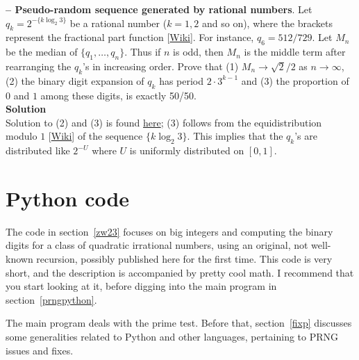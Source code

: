 \documentclass[oneside,10pt]{book}
\renewcommand{\arraystretch}{1.4} %
\begin{document}
\begin{Exercise}\label{q23}{\bf -- Pseudo-random sequence generated by rational numbers}. Let $q_k=2^{-\{k\log_2 3\}}$ be a rational number ($k=1,2$ and so on), where the brackets represent
the \textcolor{index}{fractional part function} [\href{https://en.wikipedia.org/wiki/Fractional_part}{Wiki}].
For instance, $q_6=512/729$. Let $M_n$ be the median of
$\{q_1,\dots,q_n\}$. Thus if $n$ is odd, then $M_n$ is the middle term after rearranging the $q_k$'s in increasing order. Prove
 that (1) $M_n\rightarrow\sqrt{2}/2$ as $n\rightarrow\infty$, (2) the binary digit expansion of $q_k$ has period $2\cdot 3^{k-1}$ and (3) the proportion of  $0$ and $1$ among these digits, is exactly 50/50.
\vspace{1ex} \\
{\bf Solution} \vspace{1ex} \\
Solution to (2) and (3) is found \href{https://math.stackexchange.com/questions/3310862/what-is-the-period-of-the-fraction-1-3k-in-base-2-for-k-1-2-dots}{here}; (3) follows from the \textcolor{index}{equidistribution modulo $1$} [\href{https://en.wikipedia.org/wiki/Equidistribution_theorem}{Wiki}]
of the sequence $\{ k \log_2 3\}$.
This implies that the $q_k$'s are distributed like $2^{-U}$ where $U$ is uniformly distributed on $[0, 1]$.
\end{Exercise}

\renewcommand{\arraystretch}{1.0} %
\renewcommand{\arraystretch}{1.4} %

\section{Python code}\label{pythonviz}

The code in section~\ref{zw23} focuses on big integers and computing the binary digits for a class of quadratic irrational numbers,
  using an original, not well-known recursion, possibly published here for the first time. This code is very short, and the description is accompanied
 by pretty cool math. I recommend that you start  looking at it, before digging into the main program in section~\ref{prngpython}.

The main program deals with the prime test. Before that, section~\ref{fixp} discusses some generalities related to Python and other languages,
 pertaining to PRNG issues and fixes.
\end{document}
